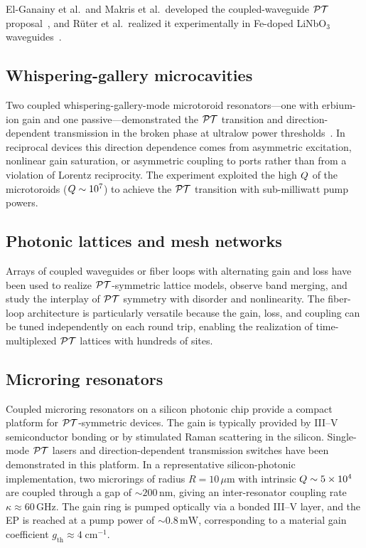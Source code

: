 El-Ganainy et al.\ and Makris et al.\ developed the coupled-waveguide
$\mathcal{PT}$ proposal~\cite{elganainy2007theory,makris2008beam}, and R\"uter
et al.\ realized it experimentally in Fe-doped LiNbO$_3$
waveguides~\cite{rter2010observation}.

\subsection{Whispering-gallery microcavities}
\label{ssec:pt-wgm}

Two coupled whispering-gallery-mode microtoroid resonators---one with
erbium-ion gain and one passive---demonstrated the $\mathcal{PT}$ transition
and direction-dependent transmission in the broken phase at ultralow
power thresholds~\cite{peng2014parity}. In reciprocal devices this
direction dependence comes from asymmetric excitation, nonlinear gain
saturation, or asymmetric coupling to ports rather than from a violation
of Lorentz reciprocity. The experiment exploited the
high $Q$ of the microtoroids ($Q \sim 10^7$) to achieve the
$\mathcal{PT}$ transition with sub-milliwatt pump powers.

\subsection{Photonic lattices and mesh networks}
\label{ssec:pt-lattices}

Arrays of coupled waveguides or fiber loops with alternating gain and
loss have been used to realize $\mathcal{PT}$-symmetric lattice models, observe
band merging, and study the interplay of $\mathcal{PT}$ symmetry with disorder
and nonlinearity. The fiber-loop architecture is particularly versatile
because the gain, loss, and coupling can be tuned independently on each
round trip, enabling the realization of time-multiplexed $\mathcal{PT}$ lattices
with hundreds of sites.

\subsection{Microring resonators}
\label{ssec:pt-microrings}

Coupled microring resonators on a silicon photonic chip provide a
compact platform for $\mathcal{PT}$-symmetric devices.  The gain is typically
provided by III--V semiconductor bonding or by stimulated Raman
scattering in the silicon.  Single-mode $\mathcal{PT}$ lasers and
direction-dependent transmission switches have been demonstrated in this
platform.  In a representative silicon-photonic implementation, two
microrings of radius $R = 10\,\mu\mathrm{m}$ with intrinsic
$Q \sim 5 \times 10^4$ are coupled through a gap of
$\sim 200\,\mathrm{nm}$, giving an inter-resonator coupling rate
$\kappa \approx 60\,\mathrm{GHz}$.  The gain ring is pumped optically
via a bonded III--V layer, and the EP is reached at a pump power of
$\sim 0.8\,\mathrm{mW}$, corresponding to a material gain coefficient
$g_{\mathrm{th}} \approx 4\;\mathrm{cm}^{-1}$.

